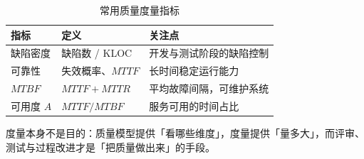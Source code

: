 \begin{table}[H]
\centering
\caption{常用质量度量指标}
\begin{tabulary}{\textwidth}{LLL}
\toprule
指标 & 定义 & 关注点 \\
\midrule
缺陷密度 & 缺陷数 / KLOC & 开发与测试阶段的缺陷控制 \\
可靠性 & 失效概率、$MTTF$ & 长时间稳定运行能力 \\
$MTBF$ & $MTTF+MTTR$ & 平均故障间隔，可维护系统 \\
可用度 $A$ & $MTTF/MTBF$ & 服务可用的时间占比 \\
\bottomrule
\end{tabulary}
\end{table}

\noindent 度量本身不是目的：质量模型提供「看哪些维度」，度量提供「量多大」，而评审、测试与过程改进才是「把质量做出来」的手段。
